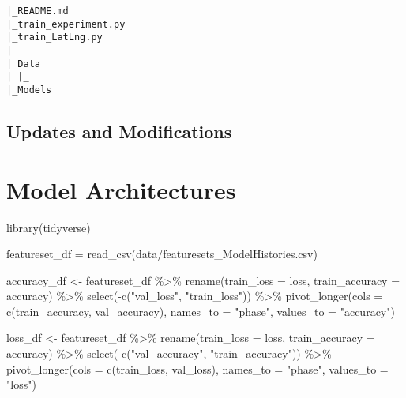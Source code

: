 \documentclass[
]{book}
\newenvironment{Shaded}{\begin{snugshade}}{\end{snugshade}}
\newcommand{\AttributeTok}[1]{\textcolor[rgb]{0.77,0.63,0.00}{#1}}
\newcommand{\FunctionTok}[1]{\textcolor[rgb]{0.00,0.00,0.00}{#1}}
\newcommand{\NormalTok}[1]{#1}
\newcommand{\OtherTok}[1]{\textcolor[rgb]{0.56,0.35,0.01}{#1}}
\newcommand{\SpecialCharTok}[1]{\textcolor[rgb]{0.00,0.00,0.00}{#1}}
\newcommand{\StringTok}[1]{\textcolor[rgb]{0.31,0.60,0.02}{#1}}
\begin{document}
\begin{verbatim}
|_README.md
|_train_experiment.py
|_train_LatLng.py
|
|_Data
| |_
|_Models
\end{verbatim}

\hypertarget{section}{%
\subsection{}\label{section}}

\hypertarget{updates-and-modifications}{%
\section{Updates and Modifications}\label{updates-and-modifications}}

\hypertarget{methods}{%
\chapter{Model Architectures}\label{methods}}

\begin{Shaded}
\begin{Highlighting}[]
\FunctionTok{library}\NormalTok{(tidyverse)}
\end{Highlighting}
\end{Shaded}

\begin{Shaded}
\begin{Highlighting}[]
\NormalTok{featureset\_df }\OtherTok{=} \FunctionTok{read\_csv}\NormalTok{(}\StringTok{\textquotesingle{}data/featuresets\_ModelHistories.csv\textquotesingle{}}\NormalTok{)}

\NormalTok{accuracy\_df }\OtherTok{\textless{}{-}}\NormalTok{ featureset\_df }\SpecialCharTok{\%\textgreater{}\%}
  \FunctionTok{rename}\NormalTok{(}\AttributeTok{train\_loss =}\NormalTok{ loss, }\AttributeTok{train\_accuracy =}\NormalTok{ accuracy) }\SpecialCharTok{\%\textgreater{}\%}
  \FunctionTok{select}\NormalTok{(}\SpecialCharTok{{-}}\FunctionTok{c}\NormalTok{(}\StringTok{"val\_loss"}\NormalTok{, }\StringTok{"train\_loss"}\NormalTok{)) }\SpecialCharTok{\%\textgreater{}\%}
  \FunctionTok{pivot\_longer}\NormalTok{(}\AttributeTok{cols =} \FunctionTok{c}\NormalTok{(train\_accuracy, val\_accuracy), }\AttributeTok{names\_to =} \StringTok{"phase"}\NormalTok{, }\AttributeTok{values\_to =} \StringTok{"accuracy"}\NormalTok{)}

\NormalTok{loss\_df }\OtherTok{\textless{}{-}}\NormalTok{ featureset\_df }\SpecialCharTok{\%\textgreater{}\%}
  \FunctionTok{rename}\NormalTok{(}\AttributeTok{train\_loss =}\NormalTok{ loss, }\AttributeTok{train\_accuracy =}\NormalTok{ accuracy) }\SpecialCharTok{\%\textgreater{}\%}
  \FunctionTok{select}\NormalTok{(}\SpecialCharTok{{-}}\FunctionTok{c}\NormalTok{(}\StringTok{"val\_accuracy"}\NormalTok{, }\StringTok{"train\_accuracy"}\NormalTok{)) }\SpecialCharTok{\%\textgreater{}\%}
  \FunctionTok{pivot\_longer}\NormalTok{(}\AttributeTok{cols =} \FunctionTok{c}\NormalTok{(train\_loss, val\_loss), }\AttributeTok{names\_to =} \StringTok{"phase"}\NormalTok{, }\AttributeTok{values\_to =} \StringTok{"loss"}\NormalTok{)}
\end{Highlighting}
\end{Shaded}
\end{document}

